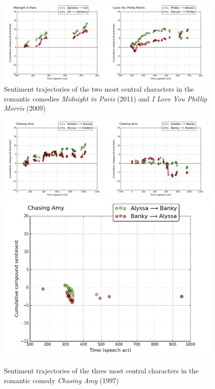 \documentclass[bsc,frontabs,singlespacing,parskip, twoside]{infthesis}
\begin{document}
\begin{figure}[h!]
\begin{adjustwidth}{-0.5in}{-0.5in}
	\centering
	\includegraphics[scale=0.43]{figures/y_romcoms}
	\caption{Sentiment trajectories of the two most central characters in the romantic comedies \textit{Midnight in Paris} (2011) and \textit{I Love You Phillip Morris} (2009)}
	\label{fig:romcoms}
\end{adjustwidth}
\end{figure}

\begin{figure}[h!]
\begin{adjustwidth}{-0.5in}{-0.5in}
	\centering
		\includegraphics[scale=0.43]{figures/chasing_amy1}
		\includegraphics[scale=0.43]{figures/chasing_amy2}
	\caption{Sentiment trajectories of the three most central characters in the romantic comedy 
\textit{Chasing Amy} (1997)}
	\label{fig:chasing_amy}
\end{adjustwidth}
\end{figure}
\end{document}
